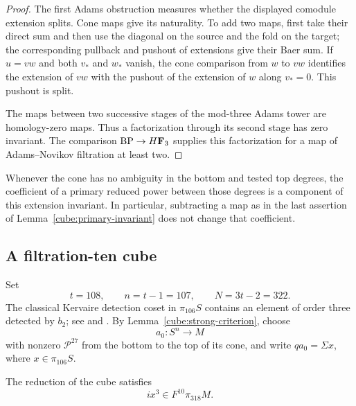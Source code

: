 \begin{proof}
The first Adams obstruction measures whether the displayed comodule
extension splits.  Cone maps give its naturality.  To add two maps,
first take their direct sum and then use the diagonal on the source
and the fold on the target; the corresponding pullback and pushout of
extensions give their Baer sum.  If \(u=vw\) and both \(v_*\) and
\(w_*\) vanish, the cone comparison from \(w\) to \(vw\) identifies
the extension of \(vw\) with the pushout of the extension of \(w\)
along \(v_*=0\).  This pushout is split.

The maps between two successive stages of the mod-three Adams tower
are homology-zero maps.  Thus a factorization through its second stage
has zero invariant.  The comparison \(\mathrm{BP}\to H\mathbf F_3\) supplies this
factorization for a map of Adams--Novikov filtration at least two.
\end{proof}

Whenever the cone has no ambiguity in the bottom and tested top
degrees, the coefficient of a primary reduced power between those
degrees is a component of this extension invariant.  In particular,
subtracting a map as in the last assertion of
Lemma~\ref{cube:primary-invariant} does not change that coefficient.

\subsection{A filtration-ten cube}

Set
\begin{equation}\label{cube:dimensions}
 t=108,\qquad n=t-1=107,\qquad N=3t-2=322.
\end{equation}
The classical Kervaire detection coset in \(\pi_{106}S\) contains
an element of order three detected by
\(b_2\); see \cite[Corollary~1.2 and its proof]{Amelotte} and
\cite[Table~A3.4]{Ravenel}.  By
Lemma~\ref{cube:strong-criterion}, choose
\[
 a_0:S^n\longrightarrow M
\]
with nonzero \(\mathcal P^{27}\) from the bottom to the top of its cone,
and write \(qa_0=\Sigma x\), where \(x\in\pi_{106}S\).

\begin{proposition}\label{cube:cubic-filtration}
The reduction of the cube satisfies
\[
 ix^3\in F^{10}\pi_{318}M.
\]
\end{proposition}

